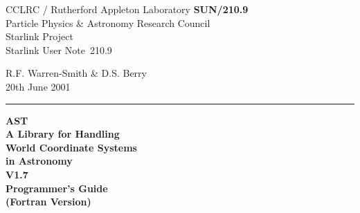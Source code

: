 \documentclass[twoside,11pt]{article}
\newcommand{\stardoccategory}  {Starlink User Note}
\newcommand{\stardocinitials}  {SUN}
\newcommand{\stardocnumber}    {210.9}
\newcommand{\stardocauthors}   {R.F. Warren-Smith \& D.S. Berry}
\newcommand{\stardocdate}      {20th June 2001}
\newcommand{\stardoctitle}     {AST\\
                                A Library for Handling\\
                                World Coordinate Systems\\
                                in Astronomy}
\newcommand{\stardocversion}   {V1.7}
\newcommand{\stardocmanual}    {Programmer's Guide\\(Fortran Version)}
\newcommand{\stardocname}{\stardocinitials /\stardocnumber}
\newenvironment{latexonly}{}{}
\begin{document}
\thispagestyle{empty}

\begin{latexonly}
   CCLRC / {\sc Rutherford Appleton Laboratory} \hfill {\bf \stardocname}\\
   {\large Particle Physics \& Astronomy Research Council}\\
   {\large Starlink Project\\}
   {\large \stardoccategory\ \stardocnumber}
   \begin{flushright}
   \stardocauthors\\
   \stardocdate
   \end{flushright}
   \vspace{-4mm}
   \rule{\textwidth}{0.5mm}
   \vspace{-7mm}
   \begin{center}
   {\Huge\bf  \stardoctitle \\ [2.0ex]}
   {\LARGE\bf \stardocversion \\ [1.0ex]}
   {\Huge\bf  \stardocmanual}
   \end{center}


\end{latexonly}
\end{document}
